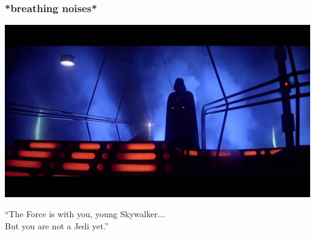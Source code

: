 \begin{frame}
\frametitle{*breathing noises*}

\begin{center}
	\includegraphics[width=\textwidth]{images/vader.jpg}
\end{center}

``The Force is with you, young Skywalker...\\
\quad But you are not a Jedi yet.''


\end{frame}




